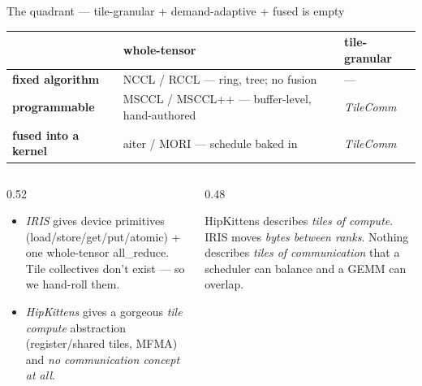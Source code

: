 \documentclass[pdf,aspectratio=169]{beamer}
\newcommand{\empy}[1]{{\color{darkorange}\emph{#1}}}
\newcommand{\empr}[1]{{\color{cardinalred}\emph{#1}}}
\newcommand{\examplebox}[2]{%
\begin{tcolorbox}[colframe=darkcardinal,colback=boxgray,title={#1}]
#2
\end{tcolorbox}}
\newcommand{\mc}[1]{{\ttfamily\small #1}}
\begin{document}
\begin{frame}{The quadrant --- tile-granular + demand-adaptive + fused is empty}
\footnotesize
\begin{center}
\begin{tabular}{lll}
\toprule
 & \textbf{whole-tensor} & \textbf{tile-granular} \\
\midrule
\textbf{fixed algorithm} & NCCL / RCCL --- ring, tree; no fusion & --- \\
\textbf{programmable}     & MSCCL / MSCCL++ --- buffer-level, hand-authored & \empr{TileComm} \\
\textbf{fused into a kernel} & aiter / MORI --- schedule baked in & \empr{TileComm} \\
\bottomrule
\end{tabular}
\end{center}
\begin{columns}
\begin{column}{0.52\textwidth}
\begin{itemize}\footnotesize
  \item \empy{IRIS} gives device primitives (\mc{load/store/get/put/atomic}) + one whole-tensor \mc{all\_reduce}. Tile collectives don't exist --- so we hand-roll them.
  \item \empy{HipKittens} gives a gorgeous \emph{tile compute} abstraction (register/shared tiles, MFMA) and \emph{no communication concept at all}.
\end{itemize}
\end{column}
\begin{column}{0.48\textwidth}
\examplebox{The missing verb}{\footnotesize
HipKittens describes \empr{tiles of compute}. IRIS moves \empr{bytes between ranks}. Nothing describes \empy{tiles of communication} that a scheduler can balance and a GEMM can overlap.}
\end{column}
\end{columns}
\end{frame}
\end{document}
